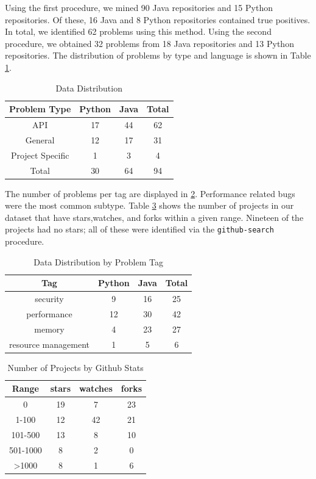 \documentclass[sigconf]{acmart}
\begin{document}
Using the first procedure, we mined 90 Java repositories and 15 Python repositories. Of these, 16 Java and 8 Python repositories contained true positives. In total, we identified 62  problems using this method. Using the second procedure, we obtained 32 problems from 18 Java repositories and 13 Python repositories. The distribution of problems by type and language is shown in Table \ref{tab:type}.

\begin{table}
  \caption{Data Distribution}
  \label{tab:type}
\begin{tabular}{ c c c c }
  \toprule
  Problem Type & Python & Java & Total\\
  \midrule
  API        		&	17  &  44 &  62\\
  General    		&	12  &  17 &  31\\
  Project Specific  	&	1  &   3 &    4\\
  \midrule
  Total      		&	30  &  64 &  94\\
  \bottomrule
\end{tabular}
\end{table}

The number of problems per tag are displayed in \ref{tab:tag}. Performance related bugs were the most common subtype. Table \ref{tab:domain} shows the number of projects in our dataset that have stars,watches, and forks within a given range. Nineteen of the projects had no stars; all of these were identified via the \texttt{github-search} procedure.

\begin{table}
  \caption{Data Distribution by Problem Tag}
  \label{tab:tag}
\begin{tabular}{  c c c c }
  \toprule
  Tag  		 	&Python &Java & Total\\
  \midrule
  security		& 9 &16 &25 \\
  performance		&12 &30 &42 \\
  memory		& 4 &23 &27 \\
  resource management	& 1 & 5&  6 \\
  \bottomrule
\end{tabular}
\end{table}

\begin{table}
  \caption{Number of Projects by Github Stats}
  \label{tab:domain}
\begin{tabular}{ c c c c }
  \toprule
  Range & stars & watches & forks\\
  \midrule
  0		&19 & 7& 23\\
  1-100		&12 &42& 21\\
  101-500	&13 & 8& 10\\
  501-1000	& 8 & 2&  0\\
  >1000   	& 8 & 1&  6\\
  \bottomrule
\end{tabular}
\end{table}
\end{document}
